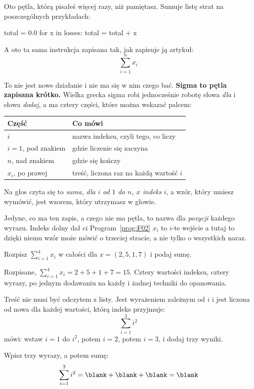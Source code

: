 \begin{fr}
Oto pętla, którą pisałeś więcej razy, niż pamiętasz. Sumuje listę strat na
poszczególnych przykładach:

\begin{python}
total = 0.0
for x in losses:
    total = total + x
\end{python}

A oto ta sama instrukcja zapisana tak, jak zapisuje ją artykuł:
\[ \sum_{i=1}^{n} x_i \]

To nie jest nowe działanie i nie ma się w nim czego bać. \textbf{Sigma to
pętla zapisana krótko.} Wielka grecka sigma robi jednocześnie robotę słowa
\emph{dla} i słowa \emph{dodaj}, a ma cztery części, które można wskazać
palcem:

\begin{center}
\begin{tabular}{ll}
\toprule
Część & Co mówi \\
\midrule
$i$ & nazwa indeksu, czyli tego, co liczy \\
$i = 1$, pod znakiem & gdzie liczenie się zaczyna \\
$n$, nad znakiem & gdzie się kończy \\
$x_i$, po prawej & treść, liczona raz na każdą wartość $i$ \\
\bottomrule
\end{tabular}
\end{center}

Na głos czyta się to \emph{suma, dla $i$ od $1$ do $n$, $x$ indeks $i$}, a
wzór, który umiesz wymówić, jest wzorem, który utrzymasz w głowie.

Jedyne, co ma ten zapis, a czego nie ma pętla, to nazwa dla \emph{pozycji}
każdego wyrazu. Indeks dolny dał ci Program~\ref{prog:F02} \dash{} $x_i$ to
$i$-te wejście \dash{} a tutaj to dzięki niemu wzór może mówić o trzeciej
stracie, a nie tylko o wszystkich naraz.

Rozpisz $\sum_{i=1}^{4} x_i$ w całości dla $x = (2, 5, 1, 7)$ i podaj sumę.
\nextframe
\end{fr}

\begin{fr}
Rozpisane, $\sum_{i=1}^{4} x_i = 2 + 5 + 1 + 7 = 15$. Cztery wartości indeksu,
cztery wyrazy, po jednym dodawaniu na każdy i żadnej techniki do opanowania.

Treść nie musi być odczytem z listy. Jest wyrażeniem zależnym od $i$ i jest
liczona od nowa dla każdej wartości, którą indeks przyjmuje:
\[ \sum_{i=1}^{3} i^{2} \]
mówi: wstaw $i = 1$ do $i^{2}$, potem $i = 2$, potem $i = 3$, i dodaj trzy
wyniki.

Wpisz trzy wyrazy, a potem sumę:
\[ \sum_{i=1}^{3} i^{2} = \blank + \blank + \blank = \blank \]
\dotline
\nextframe
\end{fr}

